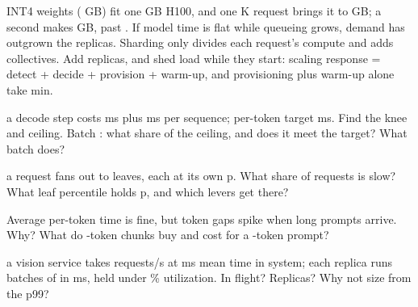 \documentclass{studysheet}
\begin{document}
\begin{rightcol}
%
  {INT4 weights ( GB) fit one  GB H100, and one K request brings it to
    GB; a second makes  GB, past .}{}
%
  {If model time is flat while queueing grows, demand has outgrown the replicas. Sharding only divides each
   request's compute and adds collectives. Add replicas, and shed load while they start: scaling response = detect +
   decide + provision + warm-up, and provisioning plus warm-up alone take  min.}{}

\vspace{2pt}
\begin{qs}
\item \assumed{} a decode step costs  ms plus  ms per sequence; per-token target  ms.
  Find the knee and ceiling. Batch : what share of the ceiling, and does it meet the target? What batch does?
\item \assumed{} a request fans out to  leaves, each at its own p. What share of requests is
  slow? What leaf percentile holds p, and which levers get there?
\item Average per-token time is fine, but token gaps spike when long prompts arrive. Why? What do -token
  chunks buy and cost for a -token prompt?
\item \assumed{} a vision service takes  requests/s at  ms mean time in system; each replica runs
  batches of  in  ms, held under \% utilization. In flight? Replicas? Why not size from the p99?
\end{qs}
\end{rightcol}
\end{document}
